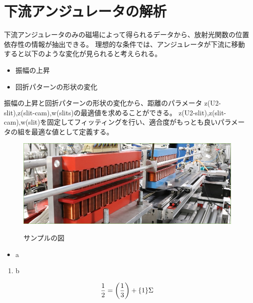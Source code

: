 \documentclass[a4paper,11pt,uplatex]{jsbook}
\begin{document}
\section{下流アンジュレータの解析}
下流アンジュレータのみの磁場によって得られるデータから、放射光関数の位置依存性の情報が抽出できる。
理想的な条件では、アンジュレータが下流に移動すると以下のような変化が見られると考えられる。
\begin{itemize}
  \item 振幅の上昇
  \item 回折パターンの形状の変化
\end{itemize}
振幅の上昇と回折パターンの形状の変化から、距離のパラメータ z(U2-slit),z(slit-cam),w(slits)の最適値を求めることができる。
z(U2-slit),z(slit-cam),w(slit)を固定してフィッティングを行い、適合度がもっとも良いパラメータの組を最適な値として定義する。





\clearpage

\begin{figure}[tb]
  \centering
  \includegraphics[width=0.8\linewidth]{image/1-1.jpg}\\
  \caption{サンプルの図}
  \label{sample_image}
\end{figure}

\begin{itemize}
  \item a
\end{itemize}
\begin{enumerate}
  \item b
\end{enumerate}

\begin{align}
\frac{1}{2} = \qty(\frac{1}{3}) + \qty{1}\Sigma
\end{align}
\end{document}
